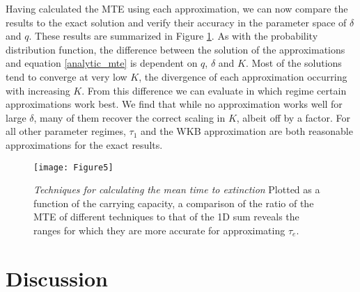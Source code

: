 Having calculated the MTE using each approximation, we can now compare the results to the exact solution and verify their accuracy in the parameter space of $\delta$ and $q$.
These results are summarized in Figure \ref{mte_techn}.
As with the probability distribution function, the difference between the solution of the approximations and equation \ref{analytic_mte} is dependent on $q$, $\delta$ and $K$. 
Most of the solutions tend to converge at very low $K$, the divergence of each approximation occurring with increasing $K$. 
From this difference we can evaluate in which regime certain approximations work best.
We find that while no approximation works well for large $\delta$, many of them recover the correct scaling in $K$, albeit off by a factor. %
For all other parameter regimes, $\tau_1$ and the WKB approximation are both reasonable approximations for the exact results. %

\begin{figure}[ht!]
	\centering
	\texttt{[image: Figure5]}
	\caption{\emph{Techniques for calculating the mean time to extinction} Plotted as a function of the carrying capacity, a comparison of the ratio of the MTE of different techniques to that of the 1D sum reveals the ranges for which they are more accurate for approximating $\tau_{e}$.} \label{mte_techn}
\end{figure}








\section{Discussion}

